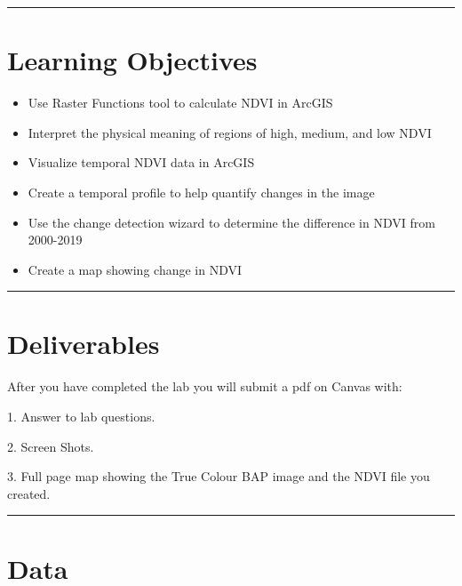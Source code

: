 \documentclass[
]{book}
\providecommand{\tightlist}{%
  \setlength{\itemsep}{0pt}\setlength{\parskip}{0pt}}
\begin{document}
\begin{center}\rule{0.5\linewidth}{0.5pt}\end{center}

\hypertarget{learning-objectives-6}{%
\section*{Learning Objectives}\label{learning-objectives-6}}

\begin{itemize}
\tightlist
\item
  Use Raster Functions tool to calculate NDVI in ArcGIS
\item
  Interpret the physical meaning of regions of high, medium, and low NDVI
\item
  Visualize temporal NDVI data in ArcGIS
\item
  Create a temporal profile to help quantify changes in the image
\item
  Use the change detection wizard to determine the difference in NDVI from 2000-2019
\item
  Create a map showing change in NDVI
\end{itemize}

\begin{center}\rule{0.5\linewidth}{0.5pt}\end{center}

\hypertarget{lab7-deliverables}{%
\section*{Deliverables}\label{lab7-deliverables}}

After you have completed the lab you will submit a pdf on Canvas with:

1. Answer to lab questions.

2. Screen Shots.

3. Full page map showing the True Colour BAP image and the NDVI file you created.

\begin{center}\rule{0.5\linewidth}{0.5pt}\end{center}

\hypertarget{data-4}{%
\section*{Data}\label{data-4}}
\end{document}
